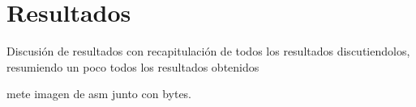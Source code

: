 \section{Resultados}

Discusión de resultados con recapitulación de todos los resultados discutiendolos, resumiendo un poco todos los resultados obtenidos













\citep{gibert2022fusing} mete imagen de asm junto con bytes.

